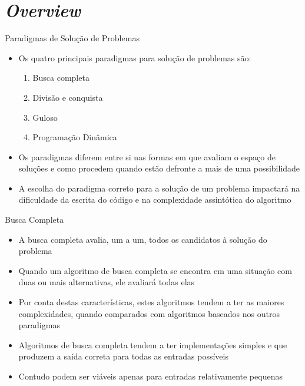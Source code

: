 \section{\it Overview}

\begin{frame}[fragile]{Paradigmas de Solução de Problemas}

    \begin{itemize}
        \item Os quatro principais paradigmas para solução de problemas são:

        \begin{enumerate}
            \item Busca completa
            \item Divisão e conquista
            \item Guloso
            \item Programação Dinâmica
        \end{enumerate}

        \item Os paradigmas diferem entre si nas formas em que avaliam o espaço de soluções e
            como procedem quando estão defronte a mais de uma possibilidade

        \item A escolha do paradigma correto para a solução de um problema impactará na dificuldade
            da escrita do código e na complexidade assintótica do algoritmo
    \end{itemize}

\end{frame}

\begin{frame}[fragile]{Busca Completa}

    \begin{itemize}
        \item A busca completa avalia, um a um, todos os candidatos à solução do problema

        \item Quando um algoritmo de busca completa se encontra em uma situação com duas ou
            mais alternativas, ele avaliará todas elas

        \item Por conta destas características, estes algoritmos tendem a ter as maiores
            complexidades, quando comparados com algoritmos baseados nos outros paradigmas

        \item Algoritmos de busca completa tendem a ter implementações simples e que produzem a
            saída correta para todas as entradas possíveis

        \item Contudo podem ser viáveis apenas para entradas relativamente pequenas
    \end{itemize}

\end{frame}

